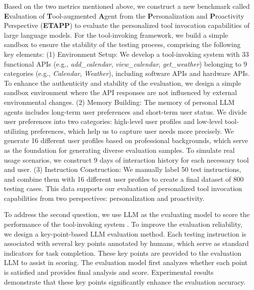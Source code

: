 \documentclass[11pt]{article}
\begin{document}
Based on the two metrics mentioned above, we construct a new benchmark called \textbf{E}valuation of \textbf{T}ool-augmented \textbf{A}gent from the \textbf{P}ersonalization and \textbf{P}roactivity Perspective (\textbf{ETAPP}) to evaluate the personalized tool invocation capabilities of large language models. For the tool-invoking framework, we build a simple sandbox to ensure the stability of the testing process, comprising the following key elements: (1) Environment Setup: We develop a tool-invoking system with 33 functional APIs (e.g., \textit{add\_calendar}, \textit{view\_calendar}, \textit{get\_weather}) belonging to 9 categories (e.g., \textit{Calendar}, \textit{Weather}), including software APIs and hardware APIs. To enhance the authenticity and stability of the evaluation, we design a simple sandbox environment where the API responses are not influenced by external environmental changes. (2)	Memory Building: The memory of personal LLM agents includes long-term user preferences and short-term user status. We divide user preferences into two categories: high-level user profiles and low-level tool-utilizing preferences, which help us to capture user needs more precisely. We generate 16 different user profiles based on professional backgrounds, which serve as the foundation for generating diverse evaluation samples. To simulate real usage scenarios, we construct 9 days of interaction history for each necessary tool and user.
(3)	Instruction Construction: We manually label 50 test instructions, and combine them with 16 different user profiles to create a final dataset of 800 testing cases. This data supports our evaluation of personalized tool invocation capabilities from two perspectives: personalization and proactivity. 




To address the second question, we use LLM as the evaluating model to score the performance of the tool-invoking system \cite{li2025generationjudgmentopportunitieschallenges, li2024llmsasjudgescomprehensivesurveyllmbased}. To improve the evaluation reliability, we design a key-point-based LLM evaluation method. Each testing instruction is associated with several key points annotated by humans, which serve as standard indicators for task completion. These key points are provided to the evaluation LLM to assist in scoring. The evaluation model first analyzes whether each point is satisfied and provides final analysis and score. Experimental results demonstrate that these key points significantly enhance the evaluation accuracy. 
\end{document}
